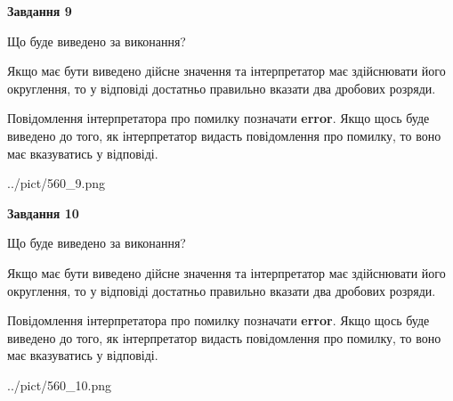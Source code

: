 \documentclass[12pt, ukrainian]{article}
\begin{document}
{\begin {Large}
{\begin {center}\textbf{Завдання 9}\end {center}}\par
Що буде виведено за виконання? \par

Якщо має бути виведено дійсне значення та інтерпретатор має здійснювати його округлення, 
то у відповіді достатньо правильно вказати два дробових розряди.

Повідомлення інтерпретатора про помилку позначати \textbf{error}.
Якщо щось буде виведено до того, як інтерпретатор видасть повідомлення про помилку, 
то воно має вказуватись у відповіді. \par

\begin{center}
	{../pict/560_9.png}
\end{center}
\newpage

{\begin {center}\textbf{Завдання 10}\end {center}}\par
Що буде виведено за виконання? \par

Якщо має бути виведено дійсне значення та інтерпретатор має здійснювати його округлення, 
то у відповіді достатньо правильно вказати два дробових розряди.

Повідомлення інтерпретатора про помилку позначати \textbf{error}.
Якщо щось буде виведено до того, як інтерпретатор видасть повідомлення про помилку, 
то воно має вказуватись у відповіді. \par

\begin{center}
	{../pict/560_10.png}
\end{center}
\newpage

\end {Large}}
\end{document}
